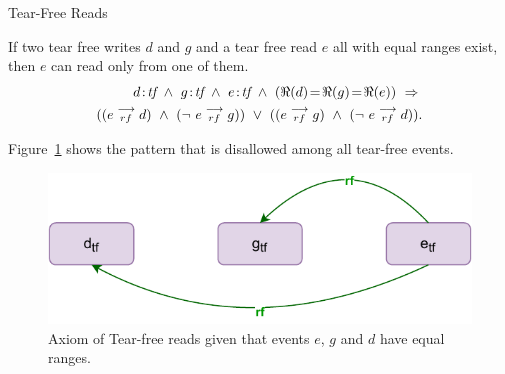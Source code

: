         \begin{axiom}{Tear-Free Reads} 
            \label{TfRe}

            If two tear free writes $d$ and $g$ and a tear free read $e$ all with equal ranges exist, then $e$ can read only from one of them\footnotemark. 
            \begin{align*}
                \et{d}{tf}\ \wedge\ \et{g}{tf} \ \wedge \ \et{e}{tf} 
                  \ \wedge \ 
                  (\Re(d) \!=\! \Re(g) \!=\! \Re(e)) 
                  \ \Rightarrow{} \\ 
                      ((\reln{e}{rf}{d}) 
                      \ \wedge \ 
                      (\neg \ \reln{e}{rf}{g})) 
                  \ \vee \  
                      ((\reln{e}{rf}{g}) 
                      \ \wedge \
                      (\neg \ \reln{e}{rf}{d})).
            \end{align*}
                    
            Figure~\ref{model:tear_free_reads} shows the pattern that is disallowed among all tear-free events. 
            \begin{figure}[H]
                \centering
                \includegraphics[scale=0.7]{3.ECMAScriptMemoryModel/TearFreeReads.pdf}
                \caption{Axiom of Tear-free reads given that events $e$, $g$ and $d$ have equal ranges.}
                \label{model:tear_free_reads}
            \end{figure}

        \end{axiom}

